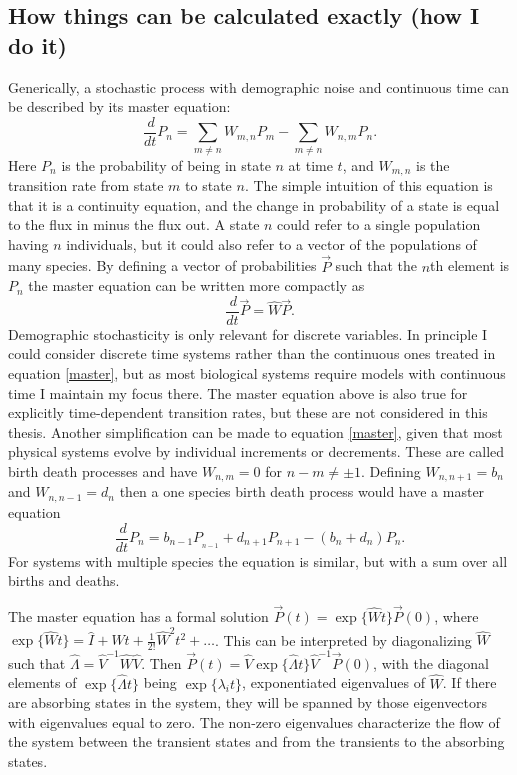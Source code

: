 \documentclass[a4paper,11pt]{article}
\numberwithin{equation}{section} %
\begin{document}
\subsection{How things can be calculated exactly (how I do it)}
Generically, a stochastic process with demographic noise and continuous time can be described by its master equation:
\begin{equation}
\frac{\,d}{dt}P_n = \sum_{m\neq n} W_{m,n}P_m - \sum_{m\neq n} W_{n,m}P_n. \label{master}
\end{equation}
Here $P_n$ is the probability of being in state $n$ at time $t$, and $W_{m,n}$ is the transition rate from state $m$ to state $n$. 
The simple intuition of this equation is that it is a continuity equation, and the change in probability of a state is equal to the flux in minus the flux out. 
A state $n$ could refer to a single population having $n$ individuals, but it could also refer to a vector of the populations of many species. 
By defining a vector of probabilities $\vec{P}$ such that the $n$th element is $P_n$ the master equation can be written more compactly as
\begin{equation*}
\frac{\,d}{dt}\vec{P} = \hat{W}\vec{P}. \label{master-vector}
\end{equation*}
Demographic stochasticity is only relevant for discrete variables. 
In principle I could consider discrete time systems rather than the continuous ones treated in equation \ref{master}, but as most biological systems require models with continuous time I maintain my focus there. 
The master equation above is also true for explicitly time-dependent transition rates, but these are not considered in this thesis. 
Another simplification can be made to equation \ref{master}, given that most physical systems evolve by individual increments or decrements. 
These are called birth death processes and have $W_{n,m}=0$ for $n-m \neq \pm 1$. 
Defining $W_{n,n+1}=b_n$ and $W_{n,n-1}=d_n$ then a one species birth death process would have a master equation
\begin{equation*}
\frac{\,d}{dt}P_n = b_{n-1}P__{n-1} + d_{n+1}P_{n+1} - (b_n+d_n)P_n. \label{master-birthdeath}
\end{equation*}
For systems with multiple species the equation is similar, but with a sum over all births and deaths. 

The master equation has a formal solution $\vec{P}(t) = \exp\{\hat{W}t\}\vec{P}(0)$, where $\exp\{\hat{W}t\}=\hat{I}+\hat{W}t+\frac{1}{2!}\hat{W}^2 t^2+\dots$. 
This can be interpreted by diagonalizing $\hat{W}$ such that $\hat{\Lambda} = \hat{V}^{-1}\hat{W}\hat{V}$. 
Then $\vec{P}(t) = \hat{V}\exp\{\hat{\Lambda}t\}\hat{V}^{-1}\vec{P}(0)$, with the diagonal elements of $\exp\{\hat{\Lambda}t\}$ being $\exp\{\lambda_i t\}$, exponentiated eigenvalues of $\hat{W}$. 
If there are absorbing states in the system, they will be spanned by those eigenvectors with eigenvalues equal to zero. 
The non-zero eigenvalues characterize the flow of the system between the transient states and from the transients to the absorbing states. 
\end{document}
